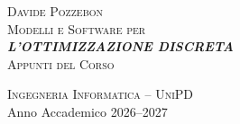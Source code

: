 \begin{titlepage}
    \centering
    
    \vspace*{2cm}
    {\large \textsc{Davide Pozzebon}}\\[3cm]
    
    {\Huge \textsc{Modelli e Software per}}\\[0.3cm]
    {\Huge \textbf{\textit{\textcolor{nord11}{L'OTTIMIZZAZIONE DISCRETA}}}}\\[1.5cm]
    
    {\Large \textsc{Appunti del Corso}}\\[2cm]
    
    \vfill
    
    {\large \textsc{Ingegneria Informatica -- UniPD}}\\[0.3cm]
    {\large Anno Accademico 2026--2027}
    
    \vspace*{1cm}
\end{titlepage}
